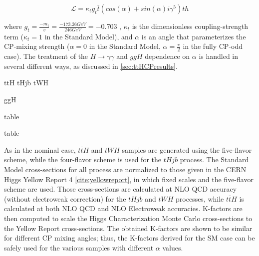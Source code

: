 \begin{equation}
\mathcal{L} = \kappa_{t} g_{t} \bar{t} (cos(\alpha)+ sin(\alpha) i \gamma^{5} )th
\end{equation}

where $g_{t} = \frac{-m_{t}}{v} = \frac{-173.26 GeV}{246 GeV} = -0.703$ , $\kappa_{t}$ is the dimensionless coupling-strength term ($\kappa_{t}= 1$ in the Standard Model), and $\alpha$ is an angle that parameterizes the CP-mixing strength ($\alpha = 0$ in the Standard Model, $\alpha = \frac{\pi}{2}$ in the fully CP-odd case). The treatment of the $H \rightarrow \gamma \gamma$ and $ggH$ dependence on $\alpha$ is handled in several different ways, as discussed in \ref{sec:ttHCPresults}.

ttH tHjb tWH

ggH


table

table

As in the nominal case, $t\bar{t}H$ and $tWH$ samples are generated using the five-flavor scheme, while the four-flavor scheme is used for the $tHjb$ process. The Standard Model cross-sections for all process are normalized to those given in the CERN Higgs Yellow Report 4 \ref{cite:yellowreport}, in which fixed scales and the five-flavor scheme are used. Those cross-sections are calculated at NLO QCD accuracy (without electroweak correction) for the $tHjb$ and $tWH$ processes, while $t\bar{t}H$ is calculated at both NLO QCD and NLO Electroweak accuracies. K-factors are then computed to scale the Higgs Characterization Monte Carlo cross-sections to the Yellow Report cross-sections. The obtained K-factors are shown to be similar for different CP mixing angles; thus, the K-factors derived for the SM case can be safely used for the various samples with different $\alpha$ values. 
